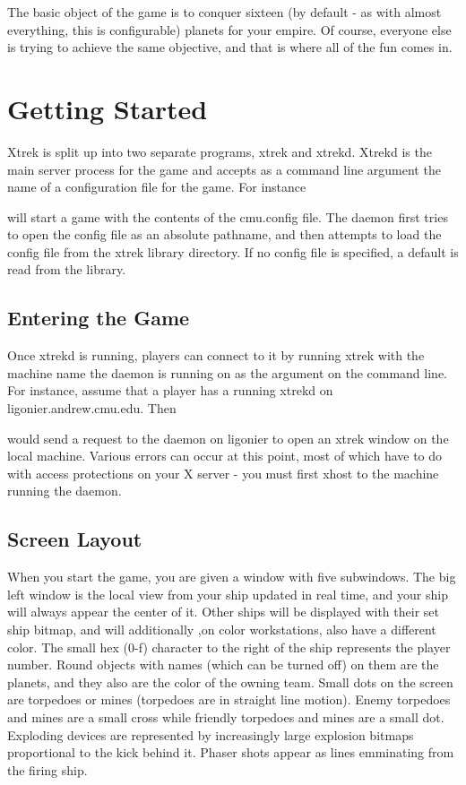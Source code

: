 The basic object of the game is to conquer sixteen (by default - as
with almost everything, this is configurable) planets for your empire.
Of course, everyone else is trying to achieve the same objective, and
that is where all of the fun comes in.

\section{Getting Started}

Xtrek is split up into two separate programs, xtrek and xtrekd. Xtrekd
is the main server process for the game and accepts as a command line
argument the name of a configuration file for the game. For instance


will start a game with the contents of the cmu.config file. The daemon
first tries to open the config file as an absolute pathname, and then
attempts to load the config file from the xtrek library directory.  If
no config file is specified, a default is read from the library. 

\subsection{Entering the Game}

Once xtrekd is running, players can connect to it by running xtrek with
the machine name the daemon is running on as the argument on the
command line. For instance, assume that a player has a running xtrekd
on ligonier.andrew.cmu.edu.  Then


would send a request to the daemon on ligonier to open an xtrek window on the local
machine. Various errors can occur at this point, most of which have to
do with access protections on your X server - you must first xhost to
the machine running the daemon.

\subsection{Screen Layout}

When you start the game, you are given a window with five subwindows.  The big
left window is the local view from your ship updated in real time, and 
your ship will always appear the center of it.
Other ships will be displayed with their set ship bitmap, and will additionally
,on color workstations, also have a
different color.  The small hex (0-f) character to the right of the ship
represents the player number.  Round objects with names (which can be turned off) 
on them are the planets, and they also are the color of the owning team.  Small dots on
the screen are torpedoes or mines (torpedoes are in straight line motion).  Enemy torpedoes 
and mines are a small cross while friendly torpedoes and mines are a small dot.  
Exploding devices are represented by increasingly large explosion bitmaps proportional to
the kick behind it.  Phaser shots appear as lines emminating from the firing ship.

